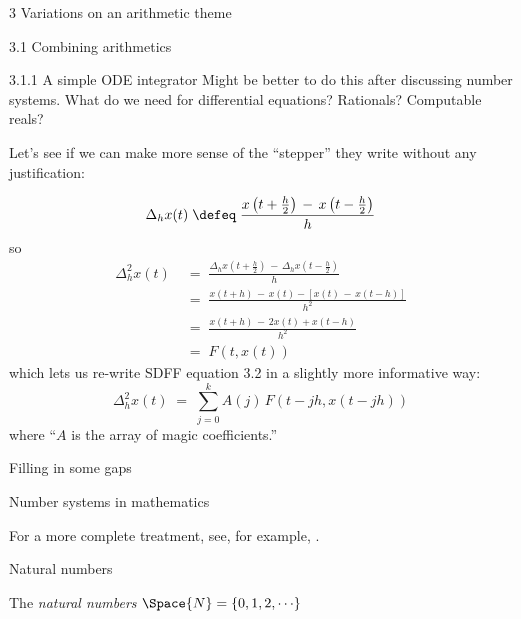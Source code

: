 \documentclass[12pt]{PalisadesLakesBook}
\begin{document}
\begin{plSection}{3 Variations on an arithmetic theme}
\begin{plSection}{3.1 Combining arithmetics}
\begin{plSection}{3.1.1 A simple ODE integrator}
\TODO
Might be better to do this after discussing number systems.
What do we need for differential equations?
Rationals? Computable reals?

\NOTE 
Let's see if we can make more sense of the ``stepper''
they write without any justification:

\begin{equation}
\Delta_{h} x(t) \; \defeq \;
\frac
{x\left(t+\frac{h}{2}\right) \,-\, x\left(t-\frac{h}{2}\right)}
{h} 
\end{equation}
so
\begin{align}
\Delta_{h}^{2} x(t) & \; = \; 
\frac{
\Delta_{h}x\left(t+\frac{h}{2}\right)
 \,-\, 
\Delta_{h}x\left(t-\frac{h}{2}\right)}
{h} \\ 
& \; = \; 
\frac
{x\left(t+h\right) \,-\, x\left(t\right)
 - \left[x\left(t\right) \,-\, x\left(t-h\right)\right]}
{h^2} \nonumber \\ 
& \; = \; 
\frac{x\left(t+h\right) \,-\, 2 x\left(t\right)
+ x\left(t-h\right)}
{h^2} \nonumber \\
& \; = \; 
F\left(t,x\left(t\right)\right) \nonumber 
\end{align}
which lets us re-write SDFF equation 3.2 in a slightly more
informative way:
\begin{equation}
\Delta_{h}^{2} x(t)  \; = \; 
\sum_{j=0}^{k}
A(j)\, F \left( t-jh, x(t-jh) \right)
\end{equation}
where ``$A$ is the array of magic coefficients.''

\end{plSection}%
\begin{plSection}{Filling in some gaps}
\begin{plSection}{Number systems in mathematics}

For a more complete treatment, 
see, for example, 
.

\begin{plSection}{Natural numbers}


The \emph{natural numbers} 
$\Space{N} = \left\{ 0, 1, 2, {\cdots}\right\}$
\end{plSection}%


\end{plSection}%


\end{plSection}
\end{plSection}
\end{plSection}
\end{document}
